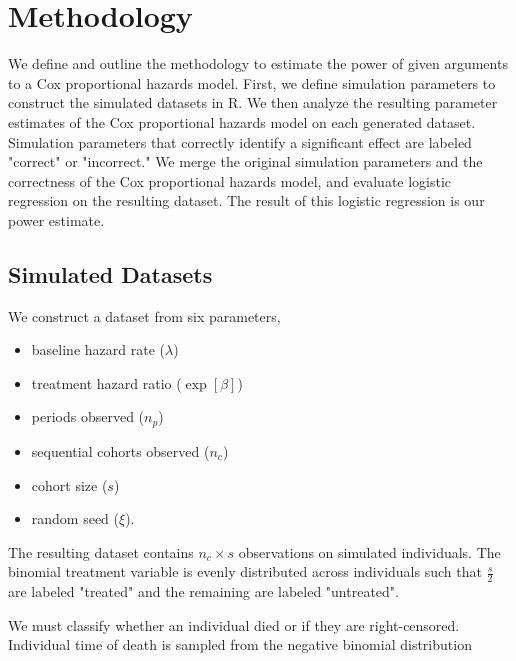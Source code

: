 \section{Methodology}
\label{sec:methodology}

We define and outline the methodology to estimate the power of given arguments to a Cox proportional hazards model. First, we define simulation parameters to construct the simulated datasets in R. We then analyze the resulting parameter estimates of the Cox proportional hazards model on each generated dataset. Simulation parameters that correctly identify a significant effect are labeled "correct" or "incorrect." We merge the original simulation parameters and the correctness of the Cox proportional hazards model, and evaluate logistic regression on the resulting dataset. The result of this logistic regression is our power estimate.


\subsection{Simulated Datasets}

We construct a dataset from six parameters\footnotemark,


\begin{itemize}
    \item baseline hazard rate ($\lambda$)
    \item treatment hazard ratio ($\exp[\beta]$)
    \item periods observed ($n_p$)
    \item sequential cohorts observed ($n_c$)
    \item cohort size ($s$)
    \item random seed ($\xi$).
\end{itemize}

The resulting dataset contains $n_c \times s$ observations on simulated individuals. The binomial treatment variable is evenly distributed across individuals such that $\frac{s}{2}$ are labeled "treated" and the remaining are labeled "untreated".

We must classify whether an individual died or if they are right-censored. Individual time of death is sampled from the negative binomial distribution\footnotemark 


